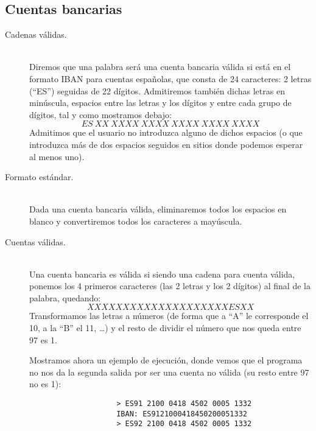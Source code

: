 \documentclass[12pt]{article}
\begin{document}
    \subsection{Cuentas bancarias}
    \begin{description}
        \item [Cadenas válidas.]~\\
            Diremos que una palabra será una cuenta bancaria válida si está en el formato IBAN para cuentas españolas, que consta de 24 caracteres: 2 letras (``ES'') seguidas de 22 dígitos. Admitiremos también dichas letras en minúscula, espacios entre las letras y los dígitos y entre cada grupo de dígitos, tal y como mostramos debajo:
            \begin{equation*}
                ES\ XX\ XXXX\ XXXX\ XXXX\ XXXX\ XXXX
            \end{equation*}
            Admitimos que el usuario no introduzca alguno de dichos espacios (o que introduzca más de dos espacios seguidos en sitios donde podemos esperar al menos uno).
        \item [Formato estándar.]~\\
            Dada una cuenta bancaria válida, eliminaremos todos los espacios en blanco y convertiremos todos los caracteres a mayúscula.
        \item [Cuentas válidas.]~\\
            Una cuenta bancaria es válida si siendo una cadena para cuenta válida, ponemos los 4 primeros caracteres (las 2 letras y los 2 dígitos) al final de la palabra, quedando:
            \begin{equation*}
                XXXXXXXXXXXXXXXXXXXXESXX
            \end{equation*}
            Transformamos las letras a números (de forma que a ``A'' le corresponde el 10, a la ``B'' el 11, \ldots) y el resto de dividir el número que nos queda entre 97 es 1.
            \begin{ejemplo}
                Mostramos ahora un ejemplo de ejecución, donde vemos que el programa no nos da la segunda salida por ser una cuenta no válida (su resto entre 97 no es 1):
                \begin{verbatim}
                    > ES91 2100 0418 4502 0005 1332
                    IBAN: ES9121000418450200051332
                    > ES92 2100 0418 4502 0005 1332
                \end{verbatim}
            \end{ejemplo}
    \end{description}
\end{document}

